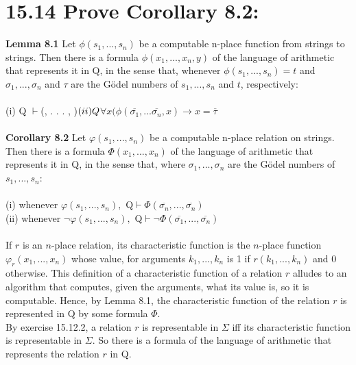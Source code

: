 \documentclass{article}
\begin{document}
\section*{15.14 Prove Corollary 8.2:}
\textbf{Lemma 8.1} Let $\phi(s_1, . . . , s_n)$ be a computable n-place function from strings to strings. Then there is a formula $\phi(x_1, . . . , x_n, y)$ of the language
of arithmetic that represents it in Q, in the sense that, whenever
$\phi(s_1, . . . , s_n) = t$ and $\sigma_1, . . . , \sigma_n$ and $\tau$ are the G\"odel numbers of $s_1, . . . , s_n$
and $t$, respectively:\\\\
(i) Q $\vdash $\phi(, . . . , \overline{\tau})$\\
(ii) Q $\vdash $\forall x (\phi(\overline{\sigma_1}, . . . \overline{\sigma_n}, x) \rightarrow x = \overline{\tau}$\\\\
\textbf{Corollary 8.2}
Let $\varphi(s_1,...,s_n)$ be a computable n-place relation on strings. Then there is a formula  $\Phi(x_1, . . . , x_n)$ of the language of arithmetic that represents it in Q, in the sense that, where  $\sigma_1, . . . ,  \sigma_n$ are the G\"odel numbers of $s_1,...,s_n$:\\
\\
(i) whenever $\varphi(s_1, . . ., s_n),$ Q$\vdash \Phi (\overline{\sigma_n}, . . . , \overline{\sigma_n})$\\
(ii) whenever $\neg \varphi(s_1, . . ., s_n),$ Q$ \vdash \neg \Phi (\overline{\sigma_1}, . . . , \overline{\sigma_n})$\\\\
If $r$ is an $n$-place relation, its characteristic function is the $n$-place function $\varphi_r(x_1, . . . , x_n)$ whose value, for arguments $k_1,...,k_n$ is 1 if $r(k_1,...,k_n)$ and 0 otherwise. This definition of a characteristic function of a relation $r$ alludes to an algorithm that computes, given the arguments, what its value is, so it is computable. Hence, by Lemma 8.1, the characteristic function of the relation $r$ is represented in Q by some formula $\Phi$.\\
By exercise 15.12.2, a relation $r$ is representable in $\Sigma$ iff its characteristic function is representable in $\Sigma$. So there is a formula of the language of arithmetic that represents the relation $r$ in Q.
\end{document}
